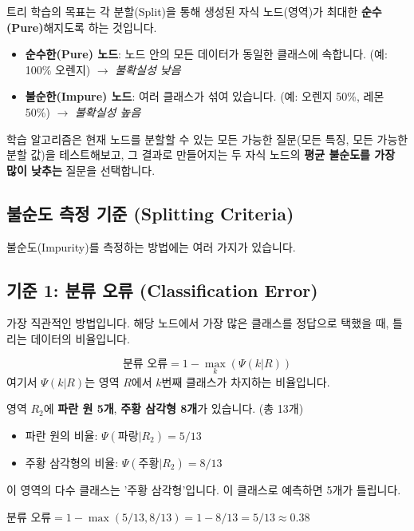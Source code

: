 \documentclass[11pt,a4paper]{book}
\theoremstyle{definition}
\begin{document}
트리 학습의 목표는 각 분할(Split)을 통해 생성된 자식 노드(영역)가 최대한 \textbf{순수(Pure)}해지도록 하는 것입니다.

\begin{itemize}
    \item \textbf{순수한(Pure) 노드}: 노드 안의 모든 데이터가 동일한 클래스에 속합니다. (예: 100\% 오렌지) $\rightarrow$ \textit{불확실성 낮음}
    \item \textbf{불순한(Impure) 노드}: 여러 클래스가 섞여 있습니다. (예: 오렌지 50\%, 레몬 50\%) $\rightarrow$ \textit{불확실성 높음}
\end{itemize}

학습 알고리즘은 현재 노드를 분할할 수 있는 모든 가능한 질문(모든 특징, 모든 가능한 분할 값)을 테스트해보고, 그 결과로 만들어지는 두 자식 노드의 \textbf{평균 불순도를 가장 많이 낮추는} 질문을 선택합니다.

\subsection{불순도 측정 기준 (Splitting Criteria)}

불순도(Impurity)를 측정하는 방법에는 여러 가지가 있습니다.

\subsection{기준 1: 분류 오류 (Classification Error)}
가장 직관적인 방법입니다. 해당 노드에서 가장 많은 클래스를 정답으로 택했을 때, 틀리는 데이터의 비율입니다.

$$ \text{분류 오류} = 1 - \max_{k}(\Psi(k|R)) $$
여기서 $\Psi(k|R)$는 영역 $R$에서 $k$번째 클래스가 차지하는 비율입니다.

\begin{examplebox}
    영역 $R_2$에 \textbf{파란 원 5개}, \textbf{주황 삼각형 8개}가 있습니다. (총 13개)
    \begin{itemize}
        \item 파란 원의 비율: $\Psi(\text{파랑}|R_2) = 5/13$
        \item 주황 삼각형의 비율: $\Psi(\text{주황}|R_2) = 8/13$
    \end{itemize}
    이 영역의 다수 클래스는 '주황 삼각형'입니다. 이 클래스로 예측하면 5개가 틀립니다.
    
    $\text{분류 오류} = 1 - \max(5/13, 8/13) = 1 - 8/13 = 5/13 \approx 0.38$
\end{examplebox}
\end{document}
